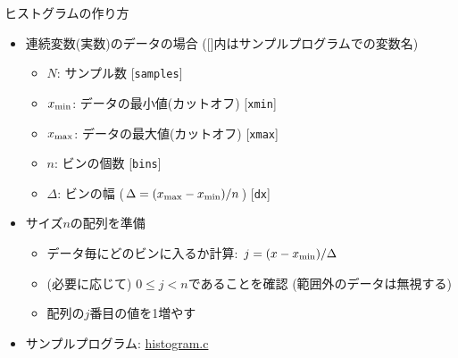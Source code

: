 \begin{frame}[t,fragile]{ヒストグラムの作り方}
  \begin{itemize}
  \item 連続変数(実数)のデータの場合 ([]内はサンプルプログラムでの変数名)
    \begin{itemize}
    \item $N$: サンプル数 [{\tt samples}]
    \item $x_{\rm min}$: データの最小値(カットオフ) [{\tt xmin}]
    \item $x_{\rm max}$: データの最大値(カットオフ) [{\tt xmax}]
    \item $n$: ビンの個数 [{\tt bins}]
    \item $\Delta$: ビンの幅 ($\Delta=(x_{\rm max}-x_{\rm min}) / n$) [{\tt dx}]
    \end{itemize}
  \item サイズ$n$の配列を準備
    \begin{itemize}
    \item データ毎にどのビンに入るか計算: $j = (x - x_{\rm min}) / \Delta$
    \item (必要に応じて) $0 \le j < n$であることを確認 (範囲外のデータは無視する)
    \item 配列の$j$番目の値を1増やす
    \end{itemize}
    \item サンプルプログラム: \href{https://github.com/todo-group/computer-experiments/blob/master/exercise/monte_carlo/histogram.c}{histogram.c}
  \end{itemize}
  \vspace*{-5cm} \hfill {}
\end{frame}
